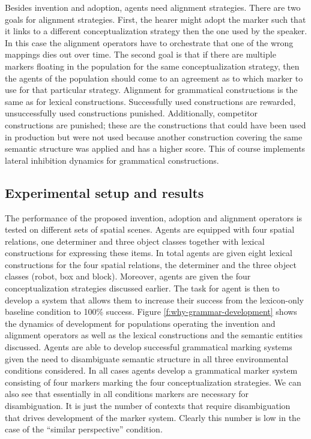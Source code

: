 Besides invention and adoption, agents need alignment strategies. 
There are two goals for alignment strategies. First, the hearer might adopt 
the marker such that it links to a different conceptualization strategy then the 
one used by the speaker. In this case the alignment operators
have to orchestrate that one of the wrong mappings dies out over time. The 
second goal is that if there are multiple markers floating in the population 
for the same conceptualization strategy, then the agents of the population 
should come to an agreement as to which marker to use
for that particular strategy. Alignment for grammatical constructions is the same 
as for lexical constructions. Successfully used constructions are rewarded, unsuccessfully used constructions punished. Additionally, competitor 
constructions are punished; these are the constructions that could have 
been used in production but were not used because another construction 
covering the same semantic structure was applied and has a higher score.\enlargethispage{\baselineskip}
This of course implements lateral inhibition dynamics for grammatical constructions. 


\subsection{Experimental setup and results}
The performance of the proposed invention, adoption and 
alignment operators is tested on different sets of spatial scenes. Agents are equipped 
with four spatial relations, one determiner and three object classes together 
with lexical constructions for expressing these items. In total
agents are given eight lexical constructions for the four spatial relations, the 
determiner and the three object classes (robot, box and block). Moreover, 
agents are given the four conceptualization strategies discussed earlier. The task for agent is then to develop a system that allows them to increase their success 
from the lexicon-only baseline condition to 100\% success. Figure 
\ref{f:why-grammar-development} shows the dynamics of development for 
populations operating the invention and alignment operators as well as 
the lexical constructions and the semantic entities discussed. Agents are able 
to develop successful grammatical marking systems given the need 
to disambiguate semantic structure in all three environmental conditions considered. 
In all cases agents develop a grammatical marker system
consisting of four markers marking the four conceptualization strategies. 
We can also see that essentially in all conditions markers are necessary for disambiguation. It is just the number of contexts that require disambiguation 
that drives development of the marker system.
Clearly this number is low in the case of the ``similar perspective'' condition.



